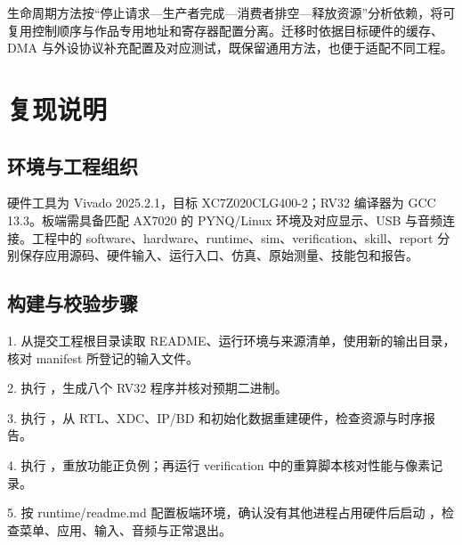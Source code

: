 \documentclass[UTF8,a4paper,12pt]{ctexart}
\begin{document}
生命周期方法按“停止请求—生产者完成—消费者排空—释放资源”分析依赖，将可复用控制顺序与作品专用地址和寄存器配置分离。迁移时依据目标硬件的缓存、DMA 与外设协议补充配置及对应测试，既保留通用方法，也便于适配不同工程。\par

\section{复现说明}

\subsection{环境与工程组织}

硬件工具为 Vivado 2025.2.1，目标 XC7Z020CLG400-2；RV32 编译器为 GCC 13.3。板端需具备匹配 AX7020 的 PYNQ/Linux 环境及对应显示、USB 与音频连接。工程中的 software、hardware、runtime、sim、verification、skill、report 分别保存应用源码、硬件输入、运行入口、仿真、原始测量、技能包和报告。\par

\subsection{构建与校验步骤}

1. 从提交工程根目录读取 README、运行环境与来源清单，使用新的输出目录，核对 manifest 所登记的输入文件。\par

2. 执行 {\fontsize{9}{12}\selectfont\texttt{}}，生成八个 RV32 程序并核对预期二进制。\par

3. 执行 {\fontsize{9}{12}\selectfont\texttt{}}，从 RTL、XDC、IP/BD 和初始化数据重建硬件，检查资源与时序报告。\par

4. 执行 {\fontsize{9}{12}\selectfont\texttt{}}，重放功能正负例；再运行 verification 中的重算脚本核对性能与像素记录。\par

5. 按 runtime/readme.md 配置板端环境，确认没有其他进程占用硬件后启动 {\fontsize{9}{12}\selectfont\texttt{}}，检查菜单、应用、输入、音频与正常退出。\par
\end{document}
